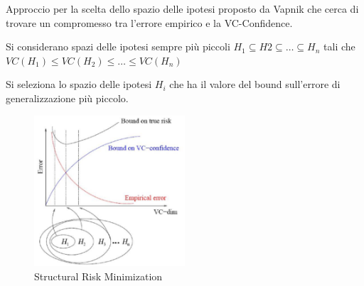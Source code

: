 Approccio per la scelta dello spazio delle ipotesi proposto da Vapnik
che cerca di trovare un compromesso tra l'errore empirico e la
VC-Confidence.

Si considerano spazi delle ipotesi sempre più piccoli $H_1 \subseteq H2 \subseteq \ldots \subseteq H_n$ tali che $ VC(H_1) \leq VC(H_2) \leq \ldots \leq VC(H_n)$

Si seleziona lo spazio delle ipotesi $H_i$ che ha il valore del bound
sull'errore di generalizzazione più piccolo.

\begin{figure}[htbp]
\centering
\includegraphics[width=0.5\textwidth]{./notes/immagini/l5-srm.png}
\caption{Structural Risk Minimization}
\end{figure}
